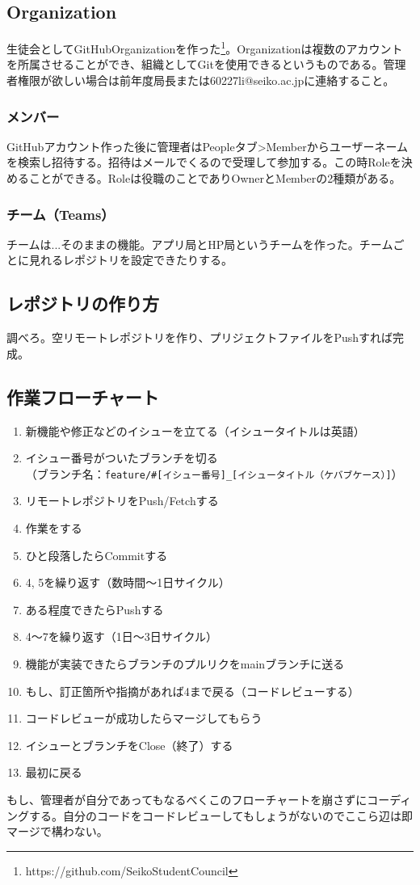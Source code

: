 \documentclass[dvipdfmx,jb5]{jarticle}
\begin{document}
\subsection{Organization}
生徒会としてGitHubOrganizationを作った\footnote{https://github.com/SeikoStudentCouncil}。Organizationは複数のアカウントを所属させることができ、組織としてGitを使用できるというものである。管理者権限が欲しい場合は前年度局長または60227li@seiko.ac.jpに連絡すること。
\subsubsection{メンバー}
GitHubアカウント作った後に管理者はPeopleタブ>Memberからユーザーネームを検索し招待する。招待はメールでくるので受理して参加する。この時Roleを決めることができる。Roleは役職のことでありOwnerとMemberの2種類がある。
\subsubsection{チーム（Teams）}
チームは...そのままの機能。アプリ局とHP局というチームを作った。チームごとに見れるレポジトリを設定できたりする。
\subsection{レポジトリの作り方}
調べろ。空リモートレポジトリを作り、プリジェクトファイルをPushすれば完成。
\subsection{作業フローチャート}
 \begin{enumerate}
 \item 新機能や修正などのイシューを立てる（イシュータイトルは英語）
 \item イシュー番号がついたブランチを切る\\
 （ブランチ名：\verb|feature/#[イシュー番号]_[イシュータイトル（ケバブケース）]|）
 \item リモートレポジトリをPush/Fetchする
 \item 作業をする
 \item ひと段落したらCommitする
 \item 4, 5を繰り返す（数時間〜1日サイクル）
 \item ある程度できたらPushする
 \item 4〜7を繰り返す（1日〜3日サイクル）
 \item 機能が実装できたらブランチのプルリクをmainブランチに送る
 \item もし、訂正箇所や指摘があれば4まで戻る（コードレビューする）
 \item コードレビューが成功したらマージしてもらう
 \item イシューとブランチをClose（終了）する
 \item 最初に戻る
 \end{enumerate}
 もし、管理者が自分であってもなるべくこのフローチャートを崩さずにコーディングする。自分のコードをコードレビューしてもしょうがないのでここら辺は即マージで構わない。
\end{document}
